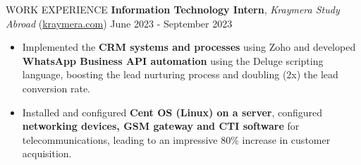 \documentclass{resume} %
\begin{document}
\begin{rSection}{WORK EXPERIENCE}
    \textbf{Information Technology Intern}, \textit{Kraymera Study Abroad} (\href{https://kraymera.com}{kraymera.com})  \hfill June 2023 - September 2023

    \begin{itemize}
        \itemsep -6pt {}
        \item Implemented the \textbf{CRM systems and processes} using Zoho and developed \textbf{WhatsApp Business API automation} using the Deluge scripting language, boosting the lead nurturing process and doubling (2x) the lead conversion rate.
        \item Installed and configured \textbf{Cent OS (Linux) on a server}, configured \textbf{networking devices, GSM gateway and CTI software} for telecommunications, leading to an impressive 80\% increase in customer acquisition.
    \end{itemize}
\end{rSection}
\end{document}
